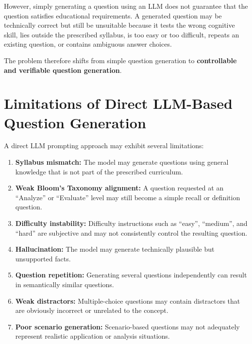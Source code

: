 \documentclass[12pt,a4paper]{report}
\begin{document}
However, simply generating a question using an LLM does not guarantee that the question satisfies educational requirements. A generated question may be technically correct but still be unsuitable because it tests the wrong cognitive skill, lies outside the prescribed syllabus, is too easy or too difficult, repeats an existing question, or contains ambiguous answer choices.

The problem therefore shifts from simple question generation to \textbf{controllable and verifiable question generation}.

\section{Limitations of Direct LLM-Based Question Generation}

A direct LLM prompting approach may exhibit several limitations:

\begin{enumerate}

\item \textbf{Syllabus mismatch:}
The model may generate questions using general knowledge that is not part of the prescribed curriculum.

\item \textbf{Weak Bloom's Taxonomy alignment:}
A question requested at an ``Analyze'' or ``Evaluate'' level may still become a simple recall or definition question.

\item \textbf{Difficulty instability:}
Difficulty instructions such as ``easy'', ``medium'', and ``hard'' are subjective and may not consistently control the resulting question.

\item \textbf{Hallucination:}
The model may generate technically plausible but unsupported facts.

\item \textbf{Question repetition:}
Generating several questions independently can result in semantically similar questions.

\item \textbf{Weak distractors:}
Multiple-choice questions may contain distractors that are obviously incorrect or unrelated to the concept.

\item \textbf{Poor scenario generation:}
Scenario-based questions may not adequately represent realistic application or analysis situations.

\end{enumerate}
\end{document}

